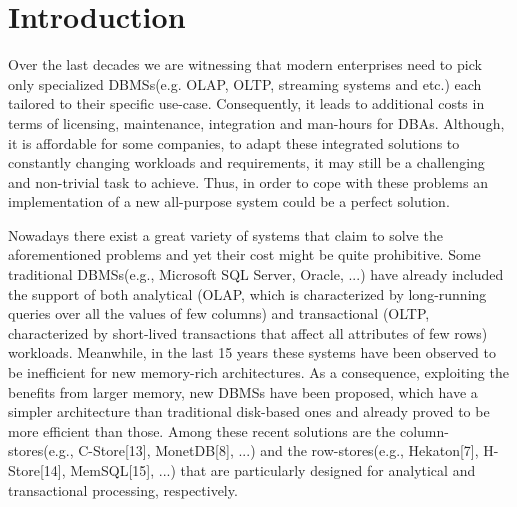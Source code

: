 \documentclass[10pt, conference, compsocconf]{IEEEtran}
\begin{document}
\section{Introduction}
Over the last decades we are witnessing that modern enterprises need to pick only  specialized DBMSs(e.g. OLAP, OLTP, streaming systems and etc.) each tailored to their specific use-case. Consequently, it leads to additional costs in terms of licensing, maintenance, integration and man-hours for DBAs. Although, it is affordable for some companies, to adapt these integrated solutions to constantly changing workloads and requirements, it may still be a challenging and non-trivial task to achieve. Thus, in order to cope with these problems an implementation of a new all-purpose system could be a perfect solution. 

Nowadays there exist a great variety of systems that claim to solve the aforementioned problems and yet their cost might be quite prohibitive. Some traditional DBMSs(e.g., Microsoft SQL Server, Oracle, ...) have already included the support of both analytical (OLAP, which is characterized by long-running queries over all the values of few columns) and transactional (OLTP, characterized by short-lived transactions that affect all attributes of few rows) workloads. Meanwhile, in the last 15 years these systems have been observed to be inefficient for new memory-rich architectures. As a consequence, exploiting the benefits from larger memory, new DBMSs have been proposed, which have a simpler architecture than traditional disk-based ones and already proved to be more efficient than those. Among these recent solutions are the column-stores(e.g., C-Store[13], MonetDB[8], ...) and the row-stores(e.g., Hekaton[7], H-Store[14], MemSQL[15], ...) that are particularly designed for analytical and transactional processing, respectively. 
\end{document}
